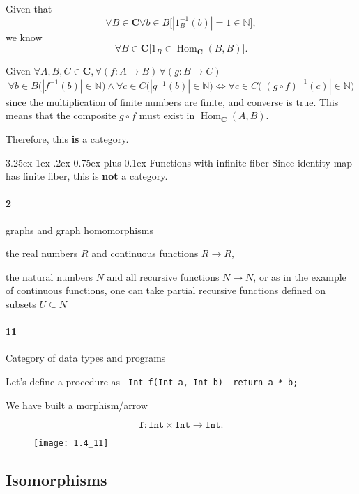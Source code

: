 \documentclass[12pt, letterpaper]{article}
\makeatletter
\renewcommand\subparagraph{\@startsection{subparagraph}{5}{\parindent}%
	{3.25ex \@plus1ex \@minus .2ex}%
	{0.75ex plus 0.1ex}%
	{\normalfont\normalsize\bfseries}}
\newcommand{\nat}{\mathbb{N}}
\newcommand{\Hom}{\operatorname{Hom}}
\newcommand{\bfC}{\mathbf{C}}
\newcommand{\red}[1]{{\color{red} #1}}
\newcommand{\card}[1]{\left\lvert #1 \right\rvert}
\theoremstyle{definition}
\theoremstyle{remark}
\theoremstyle{definition}
\theoremstyle{plain}
\numberwithin{equation}{section}
\makeatother
\begin{document}
	Given that
	\[ \forall B\in\bfC\forall b\in B \Big[\card{1_B^{-1}(b)}=1\in \nat\Big] , \]
	we know 
	\[ \forall B\in\bfC \Big[ 1_B\in\Hom_\bfC(B,B)\Big ]. \]
	
	Given $\forall A,B,C\in \bfC,\forall (f\colon A\to B) \,\forall (g\colon B\to C)$
	\[  \forall b\in B\Big(\card{f^{-1}(b)}\in\nat\Big) \land  \forall c\in C\Big(\card{g^{-1}(b)}\in\nat\Big) 
	\iff \forall c\in C \Big(\card{(g\circ f)^{-1}(c)}\in\nat\Big)
	\]
	since the multiplication of finite numbers are finite, and converse is true.
	This means that the composite $g\circ f$ must exist in $\Hom_\bfC(A,B)$.
	
	Therefore, this \textbf{is} a category.
	
	\subparagraph{Functions with infinite fiber}
	Since identity map has finite fiber, this is \textbf{not} a category.
	
	\paragraph{2}
	\begin{itemize}
		\red{
		\item graphs and graph homomorphisms
		\item the real numbers $R$ and continuous functions $R \to R$,
		\item the natural numbers $N$ and all recursive functions $N \to N$, or as in
		the example of continuous functions, one can take partial recursive
		functions defined on subsets $U \subseteq N$}
	\end{itemize}
	\paragraph{11}
	
	\red{Category of data types and programs}
	
	Let's define a procedure as
	\texttt{
		Int f(Int a, Int b) {
			return a * b;
		}
	}

	We have built a morphism/arrow
	
	\[\texttt{f}\colon \texttt{Int}\times \texttt{Int}\to \texttt{Int}.\]
	
	\begin{figure}[H]
		\centering
		\texttt{[image: 1.4\_11]}
		\caption{}
		\label{fig:1}
	\end{figure}
	
	\subsection{Isomorphisms}
\end{document}
